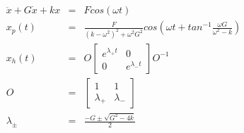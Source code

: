 \documentclass[xcolor=x11names,compress]{beamer}
\renewcommand{\(}{\begin{columns}}
\renewcommand{\)}{\end{columns}}
\newcommand{\<}[1]{\begin{column}{#1}}
\renewcommand{\>}{\end{column}}
\begin{document}
\begin{frame}[label=SHM-driven]
\begin{eqnarray*}
\ddot{x}+G\dot{x}+kx&=&Fcos(\omega t)\\
x_p(t)&=&\frac{F}{(k-\omega^2)^2+\omega^2G^2}cos(\omega t+tan^{-1}\frac{\omega G}{\omega^2-k})\\
x_h(t)&=&O\begin{bmatrix}e^{\lambda_+t} & 0\\0 & e^{\lambda_-t}\end{bmatrix}O^{-1}\\
O&=&\begin{bmatrix}1 & 1 \\ \lambda_+ & \lambda_-\end{bmatrix}\\
\lambda_\pm&=&\frac{-G\pm\sqrt{G^2-4k}}{2}
\end{eqnarray*}

\hyperlink{BackFromSHMFormula}{}
\end{frame}
\end{document}
